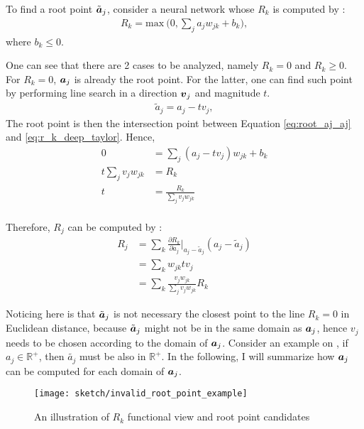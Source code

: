 To find a root point $\tilde{\patvector{a}}_j$, consider a neural network whose $R_k$ is computed by :
\begin{align}\label{eq:r_k_deep_taylor}
R_k = \text{max}\ \bigg(0, \sum_{j} a_j w_{jk}  + b_k \bigg),
\end{align}
where $b_k \le 0 $.

One can see that  there are  2 cases to be analyzed, namely $R_k = 0$ and $R_k \ge 0$. For $R_k=0$,  $\patvector{a}_j$ is already the root point. For the latter, one can find such point by performing  line search in  a direction $\patvector{v}_j$ and magnitude $t$.
\begin{align}\label{eq:root_aj_aj}
\tilde{a}_j = a_j - t v_j,
\end{align}
The root point is then the intersection point between Equation \ref{eq:root_aj_aj} and \ref{eq:r_k_deep_taylor}. Hence,
\begin{align}
  0 &= 	\sum_{j} (a_j - t v_j) w_{jk}  + b_k\\
  t \sum_{j} v_j w_{jk} &= R_k \\
  t &= \frac{R_k}{\sum_{j} v_j w_{jk}} \\
\end{align}

Therefore, $R_j$ can be computed by :
\begin{align}
R_j &= \sum_k	\frac{\partial  R_k }{ \partial a_j } \bigg|_{ a_j - \tilde{a}_j }  ( a_j - \tilde{a}_j ) \\
&=	\sum_k w_{jk} tv_j \\
&=	\sum_k \frac{ v_j w_{jk}   }{\sum_{j} v_j w_{jk}}  R_k
\end{align}

Noticing here is that $\tilde{\patvector{a}}_j$ is not necessary the closest point to the line $R_k=0$ in Euclidean distance, because  $\tilde{\patvector{a}}_j$  might not be in the same domain as $\patvector{a}_j$, hence $v_j$ needs to be chosen according to the domain of $\patvector{a}_j$. Consider an example on \addfigure{\ref{fig:root_point_illus}}, if $a_j \in \mathbb{R}^+$, then $\widetilde{a_j}$ must be also in $\mathbb{R}^+$.   In the following, I will summarize how $\patvector{a}_j$ can be computed for each domain of $\patvector{a}_j$.

\begin{figure}[h]
\centering
\texttt{[image: sketch/invalid\_root\_point\_example]}
\caption{An illustration of $R_k$ functional view and root point candidates}
\label{fig:root_point_illus}
\end{figure}

